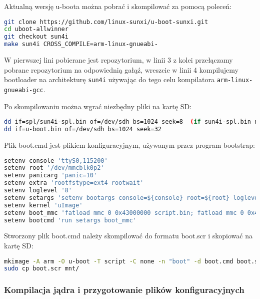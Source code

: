 \par

Aktualną wersję u-boota można pobrać i skompilować za pomocą poleceń:

\begin{lstlisting}[language=bash]
git clone https://github.com/linux-sunxi/u-boot-sunxi.git
cd uboot-allwinner
git checkout sun4i
make sun4i CROSS_COMPILE=arm-linux-gnueabi-
\end{lstlisting}

\par

W pierwszej lini pobierane jest repozytorium, w linii 3 z kolei przełączamy pobrane repozytorium na odpowiednią gałąź, wreszcie w linii 4 kompilujemy bootloader na architekturę \lstinline{sun4i} używając do tego celu kompilatora \lstinline{arm-linux-gnueabi-gcc}.

Po skompilowaniu można wgrać niezbędny pliki na kartę SD:

\begin{lstlisting}[language=bash]
dd if=spl/sun4i-spl.bin of=/dev/sdh bs=1024 seek=8  (if sun4i-spl.bin not found, try sunxi-spl.bin)
dd if=u-boot.bin of=/dev/sdh bs=1024 seek=32
\end{lstlisting}

\par

Plik boot.cmd jest plikiem konfiguracyjnym, używanym przez program bootstrap:

\begin{lstlisting}[language=bash]
setenv console 'ttyS0,115200'
setenv root '/dev/mmcblk0p2'
setenv panicarg 'panic=10'
setenv extra 'rootfstype=ext4 rootwait'
setenv loglevel '8'
setenv setargs 'setenv bootargs console=${console} root=${root} loglevel=${loglevel} ${panicarg} ${extra}'
setenv kernel 'uImage'
setenv boot_mmc 'fatload mmc 0 0x43000000 script.bin; fatload mmc 0 0x48000000 ${kernel}; bootm 0x48000000'
setenv bootcmd 'run setargs boot_mmc'
\end{lstlisting}

Stworzony plik boot.cmd należy skompilować do formatu boot.scr i skopiować na kartę SD:

\begin{lstlisting}[language=bash]
mkimage -A arm -O u-boot -T script -C none -n "boot" -d boot.cmd boot.scr
sudo cp boot.scr mnt/
\end{lstlisting}


\subsubsection{Kompilacja jądra i przygotowanie plików konfiguracyjnych}

